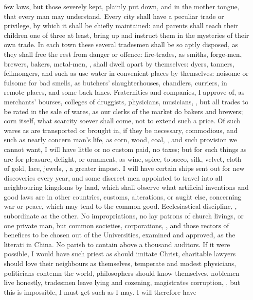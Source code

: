 few laws, but those severely kept, plainly put down, and in the mother tongue,
that every man may understand. Every city shall have a peculiar trade or
privilege, by which it shall be chiefly maintained: and
parents shall teach their children one of three at least, bring up and instruct
them in the mysteries of their own trade. In each town these several tradesmen
shall be so aptly disposed, as they shall free the rest from danger or offence:
fire-trades, as smiths, forge-men, brewers, bakers, metal-men, \etc{}, shall
dwell apart by themselves: dyers, tanners, fellmongers, and such as use water
in convenient places by themselves: noisome or fulsome for bad smells, as
butchers' slaughterhouses, chandlers, curriers, in remote places, and some back
lanes. Fraternities and companies, I approve of, as merchants' bourses,
colleges of druggists, physicians, musicians, \etc{}, but all trades to be
rated in the sale of wares, as our clerks of the market do bakers and brewers;
corn itself, what scarcity soever shall come, not to extend such a price. Of
such wares as are transported or brought in, if they be
necessary, commodious, and such as nearly concern man's life, as corn, wood,
coal, \etc{}, and such provision we cannot want, I will have little or no
custom paid, no taxes; but for such things as are for pleasure, delight, or
ornament, as wine, spice, tobacco, silk, velvet, cloth of gold, lace, jewels,
\etc{}, a greater impost. I will have certain ships sent out for new
discoveries every year, and some discreet men appointed to
travel into all neighbouring kingdoms by land, which shall observe what
artificial inventions and good laws are in other countries, customs,
alterations, or aught else, concerning war or peace, which may tend to the
common good. Ecclesiastical discipline, , subordinate as
the other. No impropriations, no lay patrons of church livings, or one private
man, but common societies, corporations, \etc{}, and those rectors of benefices
to be chosen out of the Universities, examined and approved, as the literati in
China. No parish to contain above a thousand auditors. If it were possible, I
would have such priest as should imitate Christ, charitable lawyers should love
their neighbours as themselves, temperate and modest physicians, politicians
contemn the world, philosophers should know themselves, noblemen live honestly,
tradesmen leave lying and cozening, magistrates corruption, \etc{}, but this is
impossible, I must get such as I may. I will therefore have
